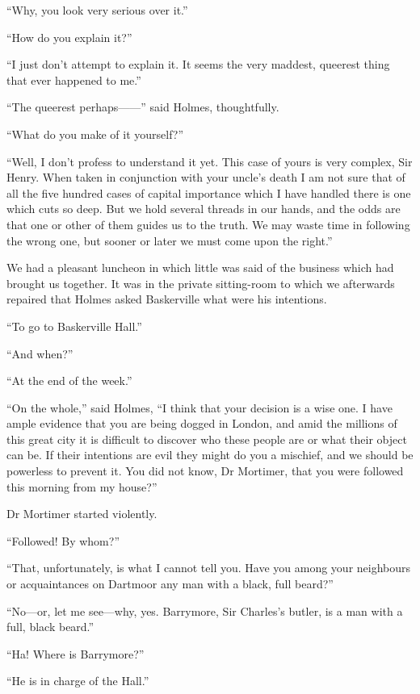 \documentclass[paper=a5,BCOR=7mm,twoside,DIV=calc,12pt,usegeometry,openany,chapterprefix,endperiod,headings=big]{scrbook} %
\begin{document}
\enquote{Why, you look very serious over it.}

\enquote{How do you explain it?}

\enquote{I just don't attempt to explain it. It seems the very maddest, queerest thing that ever happened to me.}

\enquote{The queerest perhaps------} said Holmes, thoughtfully.

\enquote{What do you make of it yourself?}

\enquote{Well, I don't profess to understand it yet. This case of yours is very complex, Sir Henry. When taken in conjunction with your uncle's death I am not sure that of all the five hundred cases of capital importance which I have handled there is one which cuts so deep. But we hold several threads in our hands, and the odds are that one or other of them guides us to the truth. We may waste time in following the wrong one, but sooner or later we must come upon the right.}

We had a pleasant luncheon in which little was said of the business which had brought us together. It was in the private sitting-room to which we afterwards repaired that Holmes asked Baskerville what were his intentions.

\enquote{To go to Baskerville Hall.}

\enquote{And when?}

\enquote{At the end of the week.}

\enquote{On the whole,} said Holmes, \enquote{I think that your decision is a wise one. I have ample evidence that you are being dogged in London, and amid the millions of this great city it is difficult to discover who these people are or what their object can be. If their intentions are evil they might do you a mischief, and we should be powerless to prevent it. You did not know, Dr Mortimer, that you were followed this morning from my house?}

Dr Mortimer started violently.

\enquote{Followed! By whom?}

\enquote{That, unfortunately, is what I cannot tell you. Have you among your neighbours or acquaintances on Dartmoor any man with a black, full beard?}

\enquote{No---or, let me see---why, yes. Barrymore, Sir Charles's butler, is a man with a full, black beard.}

\enquote{Ha! Where is Barrymore?}

\enquote{He is in charge of the Hall.}
\end{document}
